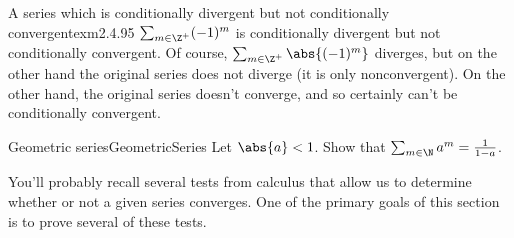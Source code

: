 \begin{exm}{A series which is conditionally divergent but not conditionally convergent}{exm2.4.95}
$\sum _{m\in \Z ^+}(-1)^m$ is conditionally divergent but not conditionally convergent.  Of course, $\sum _{m\in \Z ^+}\abs{(-1)^m}$ diverges, but on the other hand the original series does not diverge (it is only nonconvergent).  On the other hand, the original series doesn't converge, and so certainly can't be conditionally convergent.
\end{exm}

\begin{exr}{Geometric series}{GeometricSeries}
Let $\abs{a}<1$.  Show that $\sum _{m\in \N}a^m=\frac{1}{1-a}$.
\end{exr}

You'll probably recall several tests from calculus that allow us to determine whether or not a given series converges.  One of the primary goals of this section is to prove several of these tests.

